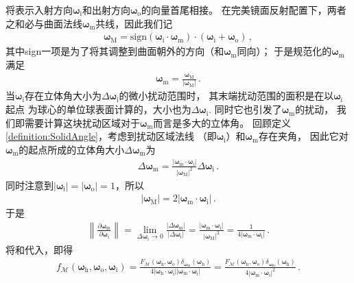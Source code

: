 将表示入射方向${\bm\omega}_{\mathrm{i}}$和出射方向${\bm\omega}_{\mathrm{o}}$的向量首尾相接。
在完美镜面反射配置下，两者之和必与曲面法线${\bm\omega}_{\mathrm{m}}$共线，因此我们记
\begin{align}
    {\bm\omega}_{\mathrm{M}}=\mathrm{sign}({\bm\omega}_{\mathrm{i}}\cdot{\bm\omega}_{\mathrm{m}})
    \cdot({\bm\omega}_{\mathrm{i}}+{\bm\omega}_{\mathrm{o}})\, ,
\end{align}
其中sign一项是为了将其调整到曲面朝外的方向（和${\bm\omega}_{\mathrm{m}}$同向）；
于是规范化的${\bm\omega}_{\mathrm{m}}$满足
\begin{align}
    {\bm\omega}_{\mathrm{m}}=\frac{{\bm\omega}_{\mathrm{M}}}{|{\bm\omega}_{\mathrm{M}}|}\, .
\end{align}
当${\bm\omega}_{\mathrm{i}}$存在立体角大小为$\Delta{\bm\omega}_{\mathrm{i}}$的微小扰动范围时，
其末端扰动范围的面积是在以${\bm\omega}_{\mathrm{i}}$起点
为球心的单位球表面计算的，大小也为$\Delta{\bm\omega}_{\mathrm{i}}$.
同时它也引发了${\bm\omega}_{\mathrm{m}}$的扰动，
我们即需要计算这块扰动区域对于${\bm\omega}_{\mathrm{m}}$而言是多大的立体角。
回顾定义\ref{definition:SolidAngle}，考虑到扰动区域法线
（即${\bm\omega}_{\mathrm{i}}$）和${\bm\omega}_{\mathrm{m}}$存在夹角，
因此它对${\bm\omega}_{\mathrm{m}}$的起点所成的立体角大小$\Delta{\bm\omega}_{\mathrm{m}}$为
\begin{align}
    \Delta{\bm\omega}_{\mathrm{m}}=\frac{|{\bm\omega}_{\mathrm{m}}\cdot{\bm\omega}_{\mathrm{i}}|}
    {|{\bm\omega}_{\mathrm{M}}|^2}\Delta{\bm\omega}_{\mathrm{i}}\, .
\end{align}
同时注意到$|{\bm\omega}_{\mathrm{i}}|=|{\bm\omega}_{\mathrm{o}}|=1$，所以
\begin{align}
    |{\bm\omega}_{\mathrm{M}}|=2|{\bm\omega}_{\mathrm{m}}\cdot{\bm\omega}_{\mathrm{i}}|\, .
\end{align}
于是
\begin{align}\label{eq:08ex01-JacobianRefraction}
    \left\lVert\frac{\partial{\bm\omega}_{\mathrm{m}}}{\partial{\bm\omega}_{\mathrm{i}}}\right\rVert
    =\lim\limits_{\Delta{\bm\omega}_{\mathrm{i}}\to0}\frac{|\Delta{\bm\omega}_{\mathrm{m}}|}{|\Delta{\bm\omega}_{\mathrm{i}}|}
    =\frac{|{\bm\omega}_{\mathrm{m}}\cdot{\bm\omega}_{\mathrm{i}}|}{|{\bm\omega}_{\mathrm{M}}|^2}
    =\frac{1}{4|{\bm\omega}_{\mathrm{m}}\cdot{\bm\omega}_{\mathrm{i}}|}\, .
\end{align}
将和代入，即得
\begin{align}
    f_{\mathcal{M}}({\bm\omega}_{\mathrm{h}},{\bm\omega}_{\mathrm{o}},{\bm\omega}_{\mathrm{i}})
    =\frac{F_{\mathcal{M}}({\bm\omega}_{\mathrm{h}},{\bm\omega}_{\mathrm{o}})
    \delta_{{\bm\omega}_{\mathrm{m}}}({\bm\omega}_{\mathrm{h}})}
    {4|{\bm\omega}_{\mathrm{h}}\cdot{\bm\omega}_{\mathrm{i}}|
    |{\bm\omega}_{\mathrm{m}}\cdot{\bm\omega}_{\mathrm{i}}|}
    =\frac{F_{\mathcal{M}}({\bm\omega}_{\mathrm{h}},{\bm\omega}_{\mathrm{o}})
    \delta_{{\bm\omega}_{\mathrm{m}}}({\bm\omega}_{\mathrm{h}})}
    {4|{\bm\omega}_{\mathrm{m}}\cdot{\bm\omega}_{\mathrm{i}}|^2}\, .
\end{align}
